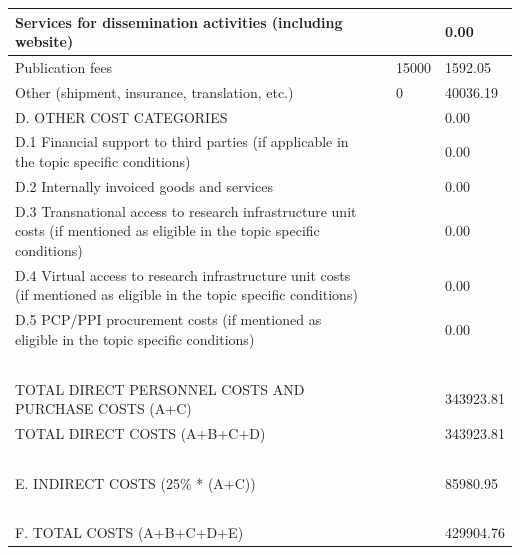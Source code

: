 \begin{table}[H]
\begin{tabular}{|l|l|l|l|}
Services for dissemination activities (including website) & ~ & ~ & 0.00 \\ \hline
Publication fees & ~ & 15000 & 1592.05 \\ \hline
Other (shipment, insurance, translation, etc.) & ~ & 0 & 40036.19 \\ \hline
D. OTHER COST CATEGORIES & ~ & ~ & 0.00\\ \hline
D.1 Financial support to third parties (if applicable in the topic specific conditions) & ~ & ~ & 0.00 \\ \hline
D.2 Internally invoiced goods and services & ~ & ~ & 0.00 \\ \hline
D.3 Transnational access to research infrastructure unit costs (if mentioned as eligible in the topic specific conditions) & ~ & ~ & 0.00 \\ \hline
D.4 Virtual access to research infrastructure unit costs (if mentioned as eligible in the topic specific conditions) & ~ & ~ & 0.00 \\ \hline
D.5 PCP/PPI procurement costs (if mentioned as eligible in the topic specific conditions) & ~ & ~ & 0.00 \\ \hline
~ & ~ & ~ & ~ \\ \hline
TOTAL DIRECT PERSONNEL COSTS AND PURCHASE COSTS (A+C) & ~ & ~ & 343923.81 \\ \hline
TOTAL DIRECT COSTS (A+B+C+D) & ~ & ~ & 343923.81 \\ \hline
~ & ~ & ~ & ~ \\ \hline
E. INDIRECT COSTS (25\% * (A+C)) & ~ & ~ & 85980.95 \\ \hline
~ & ~ & ~ & ~ \\ \hline
F. TOTAL COSTS (A+B+C+D+E) & ~ & ~ & 429904.76 \\ \hline
\end{tabular}
\end{table}


